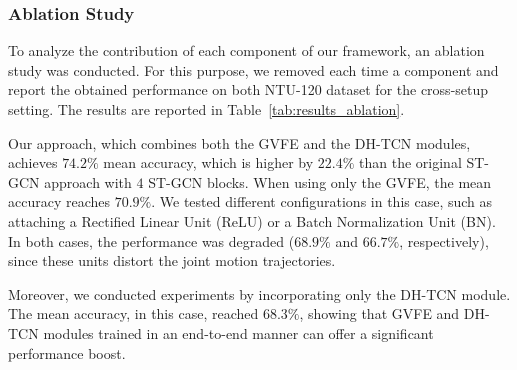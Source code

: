 \documentclass{article}
\begin{document}
\subsubsection{Ablation Study}
\label{sec:ablation_study}
To analyze the contribution of each component of our framework, an ablation study was conducted. For this purpose, we removed each time a component and report the obtained performance on both NTU-120 dataset for the cross-setup setting. The results are reported in Table~\ref{tab:results_ablation}. 

Our approach, which combines both the GVFE and the DH-TCN modules, achieves $74.2\%$ mean accuracy, which is higher by $22.4\%$ than the original ST-GCN approach with $4$ ST-GCN blocks. When using only the GVFE, the mean accuracy reaches $70.9\%$. We tested different configurations in this case, such as attaching a Rectified Linear Unit (ReLU) or a Batch Normalization Unit (BN). In both cases, the performance was degraded ($68.9\%$ and $66.7\%$, respectively), since these units distort the joint motion trajectories. 

Moreover, we conducted experiments by incorporating only the DH-TCN module. The mean accuracy, in this case, reached $68.3\%$, showing that GVFE and DH-TCN modules trained in an end-to-end manner can offer a significant performance boost.






\begin{table}[ht!]
        \centering
        \caption{Ablation study: accuracy of recognition (\%) on NTU-120 dataset for cross-setup settings using ST-GCN as a baseline. *These values are not reported in the state-of-the-art. Thus, the available codes have been used to obtain these results }
        \label{tab:results_ablation}
    \end{table}
\end{document}
